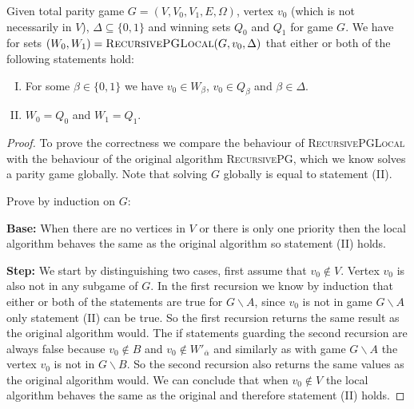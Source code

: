 \begin{theorem}
	Given total parity game $G = (V,V_0,V_1,E,\Omega)$, vertex $v_0$ (which is not necessarily in $V$), $\Delta \subseteq \{0,1\}$ and winning sets $Q_0$ and $Q_1$ for game $G$. We have for sets $(W_0,W_1) = \textsc{RecursivePGLocal}(G,v_0,\Delta)$ that either or both of the following statements hold:
	\begin{enumerate}[(I)]
		\item For some $\beta \in \{0,1\}$ we have $v_0 \in W_\beta$, $v_0 \in Q_\beta$ and $\beta \in \Delta$.
		\item $W_0 = Q_0$ and $W_1 = Q_1$.
	\end{enumerate}
\begin{proof}
	To prove the correctness we compare the behaviour of \textsc{RecursivePGLocal} with the behaviour of the original algorithm \textsc{RecursivePG}, which we know solves a parity game globally. Note that solving $G$ globally is equal to statement (II).
	
	Prove by induction on $G$:
	
	\textbf{Base: } When there are no vertices in $V$ or there is only one priority then the local algorithm behaves the same as the original algorithm so statement (II) holds.
	
	
	\textbf{Step: } We start by distinguishing two cases, first assume that $v_0 \notin V$. Vertex $v_0$ is also not in any subgame of $G$. In the first recursion we know by induction that either or both of the statements are true for $G\backslash A$, since $v_0$ is not in game $G\backslash A$ only statement (II) can be true. So the first recursion returns the same result as the original algorithm would. The if statements guarding the second recursion are always false because $v_0 \notin B$ and $v_0 \notin W'_{\overline{\alpha}}$ and similarly as with game $G\backslash A$ the vertex $v_0$ is not in $G\backslash B$. So the second recursion also returns the same values as the original algorithm would. We can conclude that when $v_0 \notin V$ the local algorithm behaves the same as the original and therefore statement (II) holds.
	

\end{proof}
\end{theorem}
